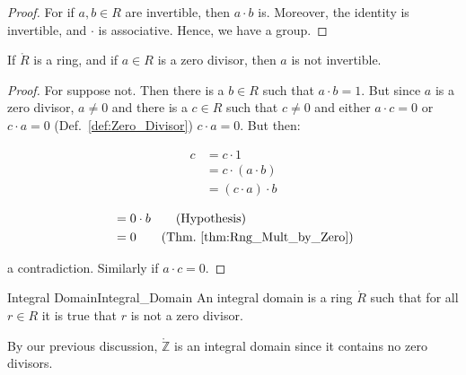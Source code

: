 \documentclass{article}                                                        %
\begin{document}
        \begin{proof}
            For if $a,b\in{R}$ are invertible, then $a\cdot{b}$ is. Moreover,
            the identity is invertible, and $\cdot$ is associative. Hence, we
            have a group.
        \end{proof}
        \begin{theorem}
            \label{thm:Ring_Zero_Divisor_Not_Invertible}%
            If $\ring{R}$ is a ring, and if $a\in{R}$ is a zero divisor, then
            $a$ is not invertible.
        \end{theorem}
        \begin{proof}
            For suppose not. Then there is a $b\in{R}$ such that $a\cdot{b}=1$.
            But since $a$ is a zero divisor, $a\ne{0}$ and there is a $c\in{R}$
            such that $c\ne{0}$ and either $a\cdot{c}=0$ or $c\cdot{a}=0$
            (Def.~\ref{def:Zero_Divisor}) $c\cdot{a}=0$. But then:
            \par
            \begin{minipage}[t]{0.49\textwidth}
                \begin{align*}
                    c&=c\cdot{1}\tag{Identity}\\
                    &=c\cdot(a\cdot{b})\tag{Inverse}\\
                    &=(c\cdot{a})\cdot{b}\tag{Associativity}
                \end{align*}
            \end{minipage}
            \hfill
            \begin{minipage}[t]{0.49\textwidth}
                \centering
                \begin{align*}
                    &=0\cdot{b}\tag{Hypothesis}\\
                    &=0\tag{Thm.~\ref{thm:Rng_Mult_by_Zero}}
                \end{align*}
            \end{minipage}
            \par\vspace{2.5ex}
            a contradiction. Similarly if $a\cdot{c}=0$.
        \end{proof}
        \begin{fdefinition}{Integral Domain}{Integral_Domain}
            An integral domain is a ring $\ring{R}$ such that for all $r\in{R}$
            it is true that $r$ is not a zero divisor.
        \end{fdefinition}
        \begin{example}
            By our previous discussion, $\ring{\mathbb{Z}}$ is an integral
            domain since it contains no zero divisors.
        \end{example}
\end{document}
